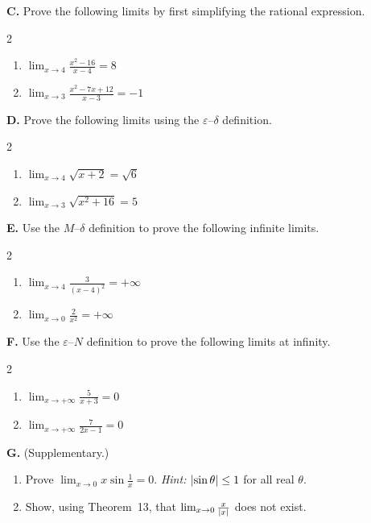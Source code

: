 \medskip
\noindent\textbf{C.} Prove the following limits by first simplifying the rational expression.

\begin{multicols}{2}
\begin{enumerate}[label=\arabic*., start=6, nosep, topsep=0pt, itemsep=2pt]
    \item \(\lim_{x \to 4} \frac{x^{2} - 16}{x - 4} = 8\)
    \item \(\lim_{x \to 3} \frac{x^{2} - 7x + 12}{x - 3} = -1\)
\end{enumerate}
\end{multicols}

\medskip
\noindent\textbf{D.} Prove the following limits using the \(\varepsilon\)--\(\delta\) definition.

\begin{multicols}{2}
\begin{enumerate}[label=\arabic*., start=8, nosep, topsep=0pt, itemsep=2pt]
    \item \(\lim_{x \to 4} \sqrt{x + 2} = \sqrt{6}\)
    \item \(\lim_{x \to 3} \sqrt{x^{2} + 16} = 5\)
\end{enumerate}
\end{multicols}

\medskip
\noindent\textbf{E.} Use the \(M\)--\(\delta\) definition to prove the following infinite limits.

\begin{multicols}{2}
\begin{enumerate}[label=\arabic*., start=10, nosep, topsep=0pt, itemsep=2pt]
    \item \(\lim_{x \to 4} \frac{3}{(x - 4)^{2}} = +\infty\)
    \item \(\lim_{x \to 0} \frac{2}{x^{2}} = +\infty\)
\end{enumerate}
\end{multicols}

\medskip
\noindent\textbf{F.} Use the \(\varepsilon\)--\(N\) definition to prove the following limits at infinity.

\begin{multicols}{2}
\begin{enumerate}[label=\arabic*., start=12, nosep, topsep=0pt, itemsep=2pt]
    \item \(\lim_{x \to +\infty} \frac{5}{x + 3} = 0\)
    \item \(\lim_{x \to +\infty} \frac{7}{2x - 1} = 0\)
\end{enumerate}
\end{multicols}

\medskip
\noindent\textbf{G.} (Supplementary.)

\begin{enumerate}[label=\arabic*., start=14, nosep, topsep=0pt, itemsep=2pt]
    \item Prove \(\lim_{x \to 0} x\sin\frac{1}{x} = 0\).  \textit{Hint:} \(\left|\sin\theta\right| \le 1\) for all real \(\theta\).
    \item Show, using Theorem~13, that \(\lim_{x \to 0} \frac{x}{\left|x\right|}\) does not exist.
\end{enumerate}